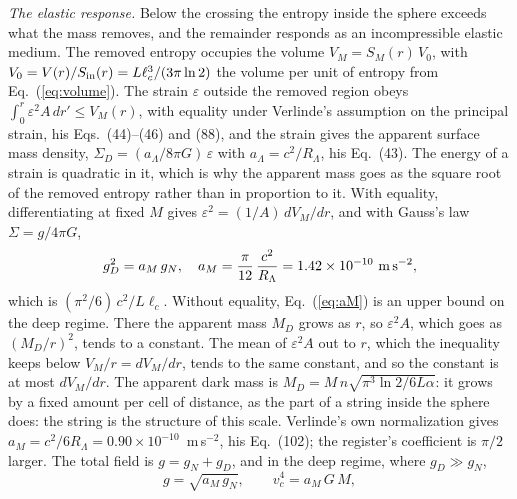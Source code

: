 \documentclass[aps,prd,twocolumn,superscriptaddress,nofootinbib,showkeys]{revtex4-2}
\newcommand{\lc}{\ell_c}
\newcommand{\RL}{R_\Lambda}
\begin{document}
\textit{The elastic response.} Below the crossing the entropy inside the sphere exceeds what the mass removes, and the remainder responds as an incompressible elastic medium. The removed entropy occupies the volume $V_M = S_M(r)\,V_0$, with $V_0 = V(r)/S_{\rm in}(r) = L\lc^3/(3\pi\ln2)$ the volume per unit of entropy from Eq.~(\ref{eq:volume}). The strain $\varepsilon$ outside the removed region obeys $\int_0^r \varepsilon^2 A\,dr' \le V_M(r)$, with equality under Verlinde's assumption on the principal strain, his Eqs.~(44)--(46) and (88), and the strain gives the apparent surface mass density, $\Sigma_D = (a_\Lambda/8\pi G)\,\varepsilon$ with $a_\Lambda = c^2/\RL$, his Eq.~(43). The energy of a strain is quadratic in it, which is why the apparent mass goes as the square root of the removed entropy rather than in proportion to it. With equality, differentiating at fixed $M$ gives $\varepsilon^2 = (1/A)\,dV_M/dr$, and with Gauss's law $\Sigma = g/4\pi G$,
\begin{equation}
g_D^2 = a_M\,g_N, \quad a_M = \frac{\pi}{12}\,\frac{c^2}{\RL} = 1.42\times10^{-10}~{\rm m\,s^{-2}} ,
\label{eq:aM}
\end{equation}
which is $(\pi^2/6)\,c^2/L\lc$. Without equality, Eq.~(\ref{eq:aM}) is an upper bound on the deep regime. There the apparent mass $M_D$ grows as $r$, so $\varepsilon^2A$, which goes as $(M_D/r)^2$, tends to a constant. The mean of $\varepsilon^2A$ out to $r$, which the inequality keeps below $V_M/r = dV_M/dr$, tends to the same constant, and so the constant is at most $dV_M/dr$. The apparent dark mass is $M_D = M\,n\sqrt{\pi^3\ln2/6L\alpha}$: it grows by a fixed amount per cell of distance, as the part of a string inside the sphere does: the string is the structure of this scale. Verlinde's own normalization gives $a_M = c^2/6\RL = 0.90\times10^{-10}$~m\,s$^{-2}$, his Eq.~(102); the register's coefficient is $\pi/2$ larger. The total field is $g = g_N + g_D$, and in the deep regime, where $g_D\gg g_N$,
\begin{equation}
g = \sqrt{a_M\,g_N},\qquad v_c^4 = a_M\,G\,M ,
\label{eq:btfr}
\end{equation}
\end{document}
